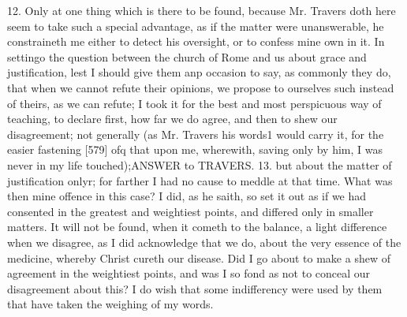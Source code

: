 12. Only at one thing which is there to be found, because Mr. Travers doth here seem to take such a special advantage, as if the matter were unanswerable, he constraineth me either to detect his oversight, or to confess mine own in it. In settingo the question between the church of Rome and us about grace and justification, lest I should give them anp occasion to say, as commonly they do, that when we cannot refute their opinions, we propose to ourselves such instead of theirs, as we can refute; I took it for the best and most perspicuous way of teaching, to declare first, how far we do agree, and then to shew our disagreement; not generally (as Mr. Travers his words1 would carry it, for the easier fastening [579] ofq that upon me, wherewith, saving only by him, I was never in my life touched);ANSWER to TRAVERS. 13. but about the matter of justification onlyr; for farther I had no cause to meddle at that time. What was then mine offence in this case? I did, as he saith, so set it out as if we had consented in the greatest and weightiest points, and differed only in smaller matters. It will not be found, when it cometh to the balance, a light difference when we disagree, as I did acknowledge that we do, about the very essence of the medicine, whereby Christ cureth our disease. Did I go about to make a shew of agreement in the weightiest points, and was I so fond as not to conceal our disagreement about this? I do wish that some indifferency were used by them that have taken the weighing of my words.

